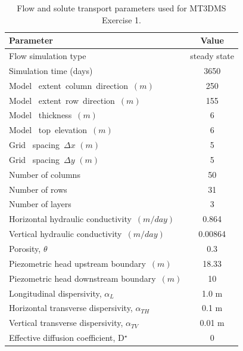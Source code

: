 \begin{table}[hb]
\caption{Flow and solute transport parameters used for MT3DMS Exercise 1.}
\begin{center}
\begin{tabular}{lc} 
\toprule
Parameter                                            &         Value \\
\midrule
Flow simulation type                                 &        steady state \\
Simulation time (days)                               &  3650           \\
Model \  extent\ column\ direction\ $ (m)$           &  250            \\
Model \  extent\ row\ direction\ $ (m)  $            &  155            \\
Model \  thickness\ $(m)$                            &    6            \\
Model \ top\ elevation\ $(m)$                        &    6            \\
Grid \ spacing\ $\Delta x $ $(m)$                    &    5            \\
Grid \ spacing\ $\Delta y $ $(m)$                    &    5            \\
Number of columns                                    &    50               \\
Number of rows                                       &    31               \\
Number of layers                                     &    3                \\
Horizontal hydraulic conductivity\ $(m/day)$         &           0.864     \\ 
Vertical   hydraulic conductivity\ $(m/day)$         &           0.00864   \\ 
Porosity, $\theta$                                   &           0.3  \\
Piezometric head upstream boundary\ $(m) $           &  18.33         \\ 
Piezometric head downstream boundary\ $(m) $         &  10            \\ 
Longitudinal dispersivity, $\alpha_L$                &           1.0 m \\
Horizontal transverse dispersivity, $\alpha_{TH}$    &           0.1 m \\
Vertical transverse dispersivity,   $\alpha_{TV}$    &           0.01 m \\
Effective diffusion coefficient, D$^{\star}$          &             0  \\
\bottomrule

\end{tabular}
\label{single_spec_table_1}
\end{center}
\end{table}

